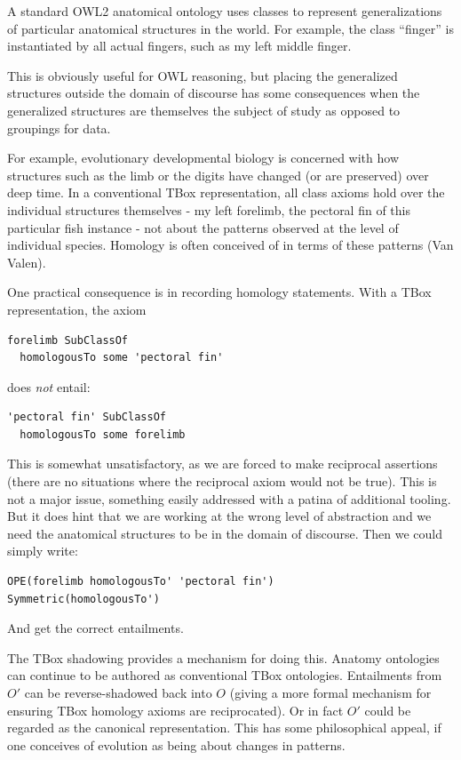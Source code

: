 \documentclass{my}
\begin{document}
A standard OWL2 anatomical ontology uses classes to represent
generalizations of particular anatomical structures in the world. For
example, the class ``finger'' is instantiated by all actual fingers,
such as my left middle finger.

This is obviously useful for OWL reasoning, but placing the
generalized structures outside the domain of discourse has some
consequences when the generalized structures are themselves the
subject of study as opposed to groupings for data.

For example, evolutionary developmental biology is concerned with how
structures such as the limb or the digits have changed (or are
preserved) over deep time. In a conventional TBox representation, all
class axioms hold over the individual structures themselves - my left
forelimb, the pectoral fin of this particular fish instance - not
about the patterns observed at the level of individual
species. Homology is often conceived of in terms of these patterns
(Van Valen).

One practical consequence is in recording homology statements. With a
TBox representation, the axiom

\begin{verbatim}
forelimb SubClassOf 
  homologousTo some 'pectoral fin'
\end{verbatim}

does \emph{not} entail:

\begin{verbatim}
'pectoral fin' SubClassOf 
  homologousTo some forelimb
\end{verbatim}

This is somewhat unsatisfactory, as we are forced to make reciprocal
assertions (there are no situations where the reciprocal axiom would
not be true). This is not a major issue, something easily addressed
with a patina of additional tooling. But it does hint that we are
working at the wrong level of abstraction and we need the anatomical
structures to be in the domain of discourse. Then we could simply
write:

\begin{verbatim}
OPE(forelimb homologousTo' 'pectoral fin')
Symmetric(homologousTo')
\end{verbatim}

And get the correct entailments. 

The TBox shadowing provides a mechanism for doing this. Anatomy
ontologies can continue to be authored as conventional TBox
ontologies. Entailments from $O'$ can be reverse-shadowed back into
$O$ (giving a more formal mechanism for ensuring TBox homology axioms
are reciprocated). Or in fact $O'$ could be regarded as the canonical
representation. This has some philosophical appeal, if one conceives
of evolution as being about changes in patterns.
\end{document}
